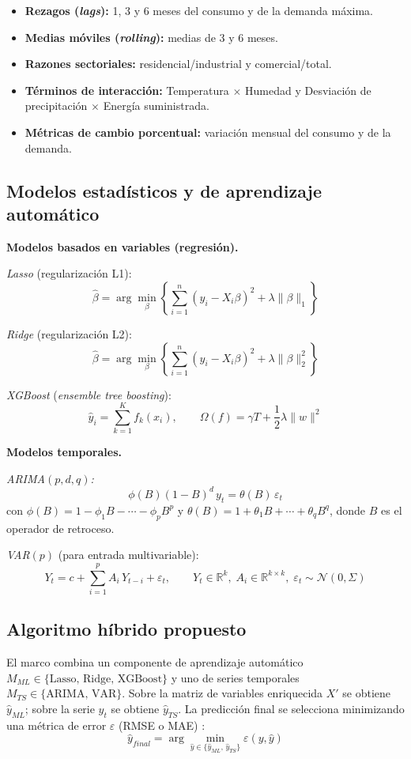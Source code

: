 \begin{itemize}
  \item \textbf{Rezagos (\textit{lags}):} 1, 3 y 6 meses del consumo y de la demanda máxima.
  \item \textbf{Medias móviles (\textit{rolling}):} medias de 3 y 6 meses.
  \item \textbf{Razones sectoriales:} residencial/industrial y comercial/total.
  \item \textbf{Términos de interacción:} Temperatura $\times$ Humedad y Desviación de precipitación $\times$ Energía suministrada.
  \item \textbf{Métricas de cambio porcentual:} variación mensual del consumo y de la demanda.
\end{itemize}

\subsection*{Modelos estadísticos y de aprendizaje automático}

\noindent\textbf{Modelos basados en variables (regresión).}

\textit{Lasso} (regularización L1):
\[ \hat{\beta}=\arg\min_{\beta}\left\{\sum_{i=1}^{n}(y_i-X_i\beta)^2+\lambda\|\beta\|_1\right\} \]

\textit{Ridge} (regularización L2):
\[ \hat{\beta}=\arg\min_{\beta}\left\{\sum_{i=1}^{n}(y_i-X_i\beta)^2+\lambda\|\beta\|_2^2\right\} \]

\textit{XGBoost} (\textit{ensemble tree boosting}):
\[ \hat{y}_i=\sum_{k=1}^{K} f_k(x_i),\qquad \Omega(f)=\gamma T+\frac{1}{2}\lambda\|w\|^2 \]

\noindent\textbf{Modelos temporales.}

\textit{ARIMA$(p,d,q)$:}
\[ \phi(B)(1-B)^d\, y_t=\theta(B)\,\varepsilon_t \]
con $\phi(B)=1-\phi_1 B-\cdots-\phi_p B^p$ y $\theta(B)=1+\theta_1 B+\cdots+\theta_q B^q$, donde $B$ es el operador de retroceso.

\textit{VAR$(p)$} (para entrada multivariable):
\[ Y_t=c+\sum_{i=1}^{p} A_i\, Y_{t-i}+\varepsilon_t,\qquad Y_t\in\mathbb{R}^k,\; A_i\in\mathbb{R}^{k\times k},\; \varepsilon_t\sim\mathcal{N}(0,\Sigma) \]

\subsection*{Algoritmo híbrido propuesto}

El marco combina un componente de aprendizaje automático $M_{ML}\in\{\text{Lasso, Ridge, XGBoost}\}$ y uno de series temporales $M_{TS}\in\{\text{ARIMA, VAR}\}$. Sobre la matriz de variables enriquecida $X'$ se obtiene $\hat{y}_{ML}$; sobre la serie $y_t$ se obtiene $\hat{y}_{TS}$. La predicción final se selecciona minimizando una métrica de error $\varepsilon$ (RMSE o MAE) \citep{zhang2003}:
\[ \hat{y}_{final}=\arg\min_{\hat{y}\in\{\hat{y}_{ML},\,\hat{y}_{TS}\}}\varepsilon(y,\hat{y}) \]

